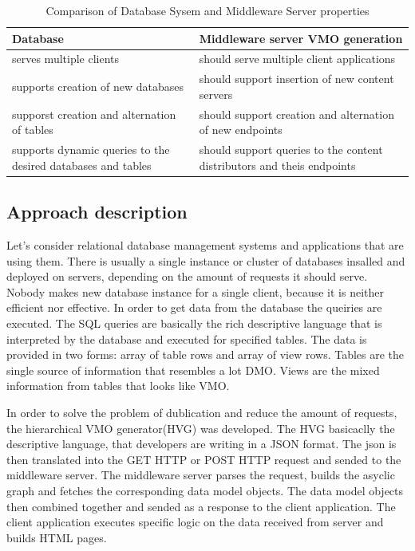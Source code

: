 \begin{table}
\begin{center}
  \begin{tabular}{||p{3in}|||p{3in}||}
    \hline
    Database & Middleware server VMO generation  \\ \hline
    serves multiple clients & should serve multiple client applications  \\ \hline
    supports creation of new databases & should support insertion of new content servers  \\ \hline
    supporst creation and alternation of tables & should support creation and alternation of new endpoints  \\ \hline
    supports dynamic queries to the desired databases and tables & should support queries to the content distributors and theis endpoints \\ \hline
    \hline
  \end{tabular}
  \caption{Comparison of Database Sysem and Middleware Server properties}
  \label{table:db_ms}
\end{center}
\end{table}

\subsection{Approach description}

Let's consider relational database management systems and applications that are using them. There is usually a single instance or cluster of databases insalled and deployed on servers, depending on the amount of requests it should serve. Nobody makes new database instance for a single client, because it is neither efficient nor effective. In order to get data from the database the queiries are executed. The SQL queries are basically the rich descriptive language that is interpreted by the database and executed for specified tables. The data is provided in two forms: array of table rows and array of view rows. Tables are the single source of information that resembles a lot DMO. Views are the mixed information from tables that looks like VMO. 

In order to solve the problem of dublication and reduce the amount of requests, the hierarchical VMO generator(HVG) was developed. The HVG basicaclly the descriptive language, that developers are writing in a JSON format. The json is then translated into the GET HTTP or POST HTTP request and sended  to the middleware server. The middleware server parses the request, builds the asyclic graph and fetches the corresponding data model objects. The data model objects then combined together and sended as a response to the client application. The client application executes specific logic on the data received from server and builds HTML pages.

